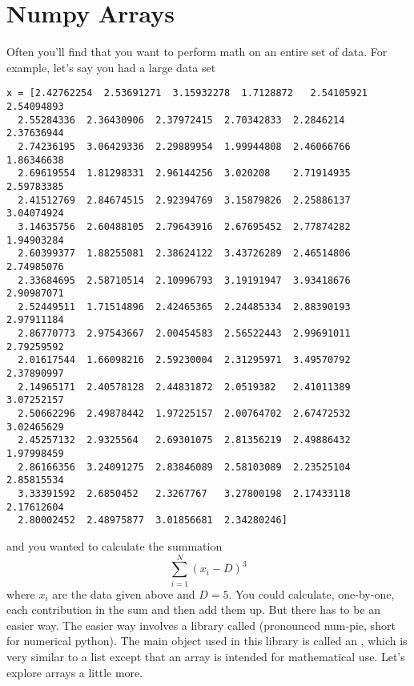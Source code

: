 \section{Numpy Arrays}
Often you'll find that you want to perform math on an entire set of
data.  For example, let's say you had a large data set
\begin{Verbatim}
x = [2.42762254  2.53691271  3.15932278  1.7128872   2.54105921  2.54094893
  2.55284336  2.36430906  2.37972415  2.70342833  2.2846214   2.37636944
  2.74236195  3.06429336  2.29889954  1.99944808  2.46066766  1.86346638
  2.69619554  1.81298331  2.96144256  3.020208    2.71914935  2.59783385
  2.41512769  2.84674515  2.92394769  3.15879826  2.25886137  3.04074924
  3.14635756  2.60488105  2.79643916  2.67695452  2.77874282  1.94903284
  2.60399377  1.88255081  2.38624122  3.43726289  2.46514806  2.74985076
  2.33684695  2.58710514  2.10996793  3.19191947  3.93418676  2.90987071
  2.52449511  1.71514896  2.42465365  2.24485334  2.88390193  2.97911184
  2.86770773  2.97543667  2.00454583  2.56522443  2.99691011  2.79259592
  2.01617544  1.66098216  2.59230004  2.31295971  3.49570792  2.37890997
  2.14965171  2.40578128  2.44831872  2.0519382   2.41011389  3.07252157
  2.50662296  2.49878442  1.97225157  2.00764702  2.67472532  3.02465629
  2.45257132  2.9325564   2.69301075  2.81356219  2.49886432  1.97998459
  2.86166356  3.24091275  2.83846089  2.58103089  2.23525104  2.85815534
  3.33391592  2.6850452   2.3267767   3.27800198  2.17433118  2.17612604
  2.80002452  2.48975877  3.01856681  2.34280246]
\end{Verbatim}
and you wanted to calculate the summation
\begin{equation}\label{eq:sum}
\sum_{i=1}^N (x_i - D)^3
\end{equation}
where $x_i$ are the data given above and $D = 5$.  You could
calculate, one-by-one, each contribution in the sum and then add them
up.  But there has to be an easier way.  The easier way involves a
library called  (pronounced num-pie, short for numerical
python).  The main object used in this library is called an
, which is very similar to a list except that an array
is intended for mathematical use.  Let's explore arrays a little more.

